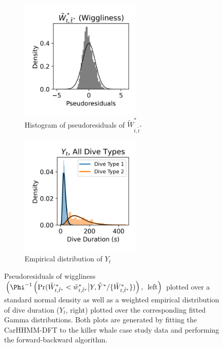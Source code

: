 \begin{figure}[ht]
    \begin{subfigure}{0.45\textwidth}
    	\centering
    	\includegraphics[width=2.25in]{../Plots/2019/20190902-182840-CATs_OB_1_0_267_CarHHMM2_pseudresids_ahat.png}
    	\caption{Histogram of pseudoresiduals of $\tilde W^*_{t,\tilde t^*}$}
    	\label{fig:pseudoresids}
    \end{subfigure}
    \begin{subfigure}{0.45\textwidth}
    	\centering
    	\includegraphics[width=2.25in]{../Plots/2019/20190902-182840-CATs_OB_1_0_267_CarHHMM2_empirical_hist_dive_duration.png}
    	\caption{Empirical distribution of $Y_t$}
    	\label{fig:empirical_dist}
    \end{subfigure}
    \caption{Pseudoresiduals of wiggliness $\left(\Phi^{-1} \left(\Pr(\Ztwo_{t,\tilde t^*} < \ztwo_{t,\tilde t^*}\big|Y,\tilde Y^* / \{\Ztwo_{t,\tilde t^*}\}) \right), \enspace \text{left} \right)$ plotted over a standard normal density as well as a weighted empirical distribution of dive duration ($Y_t$, right) plotted over the corresponding fitted Gamma distributions. Both plots are generated by fitting the CarHHMM-DFT to the killer whale case study data and performing the forward-backward algorithm.}
    \label{fig:model_checking}
\end{figure}


